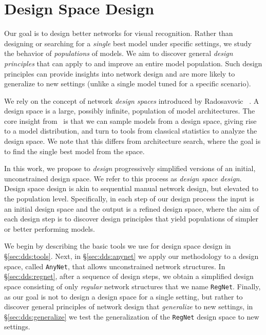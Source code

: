 \documentclass[10pt,twocolumn,letterpaper]{article}
\newcommand{\dsname}[1]{\texttt{\small #1}\xspace}
\newcommand{\anynet}{\dsname{AnyNet}}
\newcommand{\regnet}{\dsname{RegNet}}
\begin{document}
\section{Design Space Design}\label{sec:dds}

Our goal is to design better networks for visual recognition. Rather than designing or searching for a \emph{single} best model under specific settings, we study the behavior of \emph{populations} of models. We aim to discover general \emph{design principles} that can apply to and improve an entire model population. Such design principles can provide insights into network design and are more likely to generalize to new settings (unlike a single model tuned for a specific scenario).

We rely on the concept of network \emph{design spaces} introduced by Radosavovic \etal~\cite{Radosavovic2019}. A design space is a large, possibly infinite, population of model architectures. The core insight from~\cite{Radosavovic2019} is that we can sample models from a design space, giving rise to a model distribution, and turn to tools from classical statistics to analyze the design space. We note that this differs from architecture search, where the goal is to find the single best model from the space.

In this work, we propose to \emph{design} progressively simplified versions of an initial, unconstrained design space. We refer to this process as \emph{design space design}. Design space design is akin to sequential manual network design, but elevated to the population level. Specifically, in each step of our design process the input is an initial design space and the output is a refined design space, where the aim of each design step is to discover design principles that yield populations of simpler or better performing models.

We begin by describing the basic tools we use for design space design in \S\ref{sec:dds:tools}. Next, in \S\ref{sec:dds:anynet} we apply our methodology to a design space, called \anynet, that allows unconstrained network structures. In \S\ref{sec:dds:regnet}, after a sequence of design steps, we obtain a simplified design space consisting of only \emph{regular} network structures that we name \regnet. Finally, as our goal is not to design a design space for a single setting, but rather to discover general principles of network design that \emph{generalize} to new settings, in \S\ref{sec:dds:generalize} we test the generalization of the \regnet design space to new settings.
\end{document}

